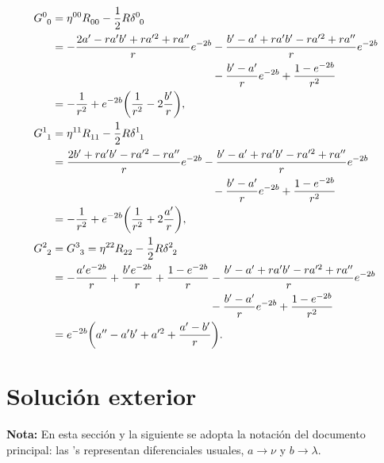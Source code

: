 \begingroup
\allowdisplaybreaks
\begin{subequations}
\begin{align}
    \tensor{G}{^0_0} &=  \tensor{\eta}{^0^0}\tensor{R}{_0_0}-\frac{1}{2}R\tensor{\delta}{^0_0} \nonumber \\
    &= - \frac{2a^\prime-r a^\prime b^\prime +r a^{\prime 2}+r a^{\prime\prime}}{r}e^{-2b} -\frac{b^\prime-a^\prime+r a^\prime b^\prime -r a^{\prime 2}+r a^{\prime\prime}}{r}e^{-2b} \nonumber \\
    &\phantom{{}= - \frac{2a^\prime-r a^\prime b^\prime +r a^{\prime 2}+r a^{\prime\prime}}{r}e^{-2b}} -\frac{b^\prime-a^\prime}{r}e^{-2b}+\frac{1-e^{-2b}}{r^2} \nonumber \\
    &= -\frac{1}{r^2}+e^{-2b}\qty(\frac{1}{r^2}-2\frac{b^\prime}{r}), \\
    \tensor{G}{^1_1} &=  \tensor{\eta}{^1^1}\tensor{R}{_1_1}-\frac{1}{2}R\tensor{\delta}{^1_1} \nonumber \\
    &= \frac{2b^\prime+r a^\prime b^\prime -r a^{\prime 2}-r a^{\prime\prime}}{r}e^{-2b} -\frac{b^\prime-a^\prime+r a^\prime b^\prime -r a^{\prime 2}+r a^{\prime\prime}}{r}e^{-2b} \nonumber \\
    &\phantom{{}= - \frac{2a^\prime-r a^\prime b^\prime +r a^{\prime 2}+r a^{\prime\prime}}{r}e^{-2b}}-\frac{b^\prime-a^\prime}{r}e^{-2b}+\frac{1-e^{-2b}}{r^2} \nonumber \\
    &= -\frac{1}{r^2}+e^{-2b}\qty(\frac{1}{r^2}+2\frac{a^\prime}{r}), \\
    \tensor{G}{^2_2}&=\tensor{G}{^3_3} =  \tensor{\eta}{^2^2}\tensor{R}{_2_2}-\frac{1}{2}R\tensor{\delta}{^2_2} \nonumber \\
    &=-\frac{a^\prime e^{-2b}}{r}+\frac{b^\prime e^{-2b}}{r}+\frac{1-e^{-2b}}{r}-\frac{b^\prime-a^\prime+r a^\prime b^\prime -r a^{\prime 2}+r a^{\prime\prime}}{r}e^{-2b} \nonumber \\
    &\phantom{{}= - \frac{a^\prime e^{-2b}}{r}+\frac{b^\prime e^{-2b}}{r}+\frac{1-e^{-2b}}{r}}-\frac{b^\prime-a^\prime}{r}e^{-2b}+\frac{1-e^{-2b}}{r^2} \nonumber \\
    &= e^{-2b}\qty(a^{\prime\prime}-a^{\prime}b^{\prime}+a^{\prime 2}+\frac{a^{\prime}-b^\prime}{r}).
\end{align}
\end{subequations}
\endgroup

\section{Solución exterior}
\noindent \small\textbf{Nota:} En esta sección y la siguiente se adopta la notación del documento principal: las 's representan diferenciales usuales, $a\to \nu$ y $b \to \lambda$.

